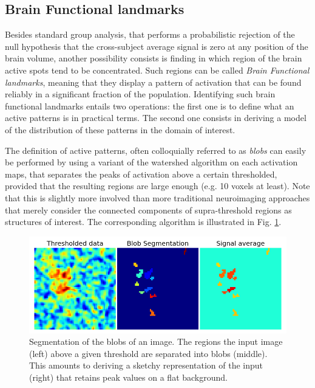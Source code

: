 \documentclass{bioinfo}
\begin{document}
\subsection{Brain Functional landmarks}

Besides standard group analysis, that performs a probabilistic
rejection of the null hypothesis that the cross-subject average signal
is zero at any position of the brain volume, another possibility
consists is finding in which region of the brain active spots tend to
be concentrated.
%
Such regions can be called \textit{Brain Functional landmarks},
meaning that they display a pattern of activation that can be found
reliably in a significant fraction of the population.
% 
Identifying such brain functional landmarks entails two operations:
the first one is to define what an active patterns is in practical
terms. The second one consists in deriving a model of the distribution
of these patterns in the domain of interest.

The definition of active patterns, often colloquially referred to as
\textit{blobs} can easily be performed by using a variant of the
watershed algorithm on each activation maps, that separates the peaks
of activation above a certain thresholded, provided that the resulting
regions are large enough (e.g. 10 voxels at least).
%
Note that this is slightly more involved than more traditional
neuroimaging approaches that merely consider the connected components
of supra-threshold regions as structures of interest.
%
The corresponding algorithm is illustrated in Fig. \ref{fig:watershed}.

\begin{figure}
\includegraphics[width=\linewidth]{Figures/blob}
\caption{Segmentation of the blobs of an image. The regions the input
  image (left) above a given threshold are separated into blobs
  (middle). This amounts to deriving a sketchy representation of the
  input (right) that retains peak values on a flat background.}
\label{fig:watershed}
\end{figure}
\end{document}

